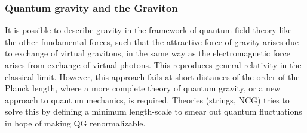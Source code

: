 \subsubsection{Quantum gravity and the Graviton}
It is possible to describe gravity in the framework of quantum field theory like the other fundamental forces, such that the attractive force of gravity arises due to exchange of virtual gravitons, in the same way as the electromagnetic force arises from exchange of virtual photons. This reproduces general relativity in the classical limit. However, this approach fails at short distances of the order of the Planck length, where a more complete theory of quantum gravity, or a new approach to quantum mechanics, is required. Theories (strings, NCG) tries to solve this by defining a minimum length-scale to smear out quantum fluctuations in hope of making QG renormalizable.

